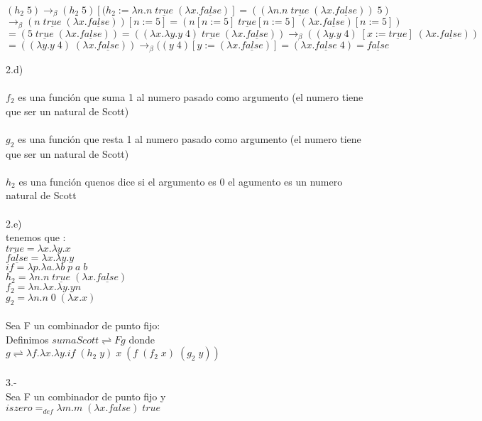 \documentclass{article}
\begin{document}
\begin{flushleft}
	\[(h_{2} \;5) \rightarrow_{\beta} (h_{2} \;5) [(h_{2} := \lambda n.n  \; \underline {true} \;(\lambda x.  \underline {false})]  =( ( \lambda n.n  \; \underline {true} \;(\lambda x.  \underline 		{false})) \;5 )\]
	\[ \rightarrow_{\beta}(n  \; \underline {true} \;(\lambda x.  \underline {false}))[n := 5] = (n[n := 5]   \; \underline {true}[n := 5]  \;(\lambda x.  \underline {false})[n := 5] )\]
	\[ = (5  \; \underline {true} \;(\lambda x.  \underline {false})) =( (\lambda x.\lambda y. y\; 4)\; \underline {true}  \;(\lambda x.  \underline {false}))  \rightarrow_{\beta} ( (\lambda y. y \; 4)\; 		[x:= \underline {true} ] \;(\lambda x.  \underline {false})) \]
	\[=((\lambda y. y \; 4)\; (\lambda x.  \underline {false})) \rightarrow_{\beta} ((y \; 4)[y :=   (\lambda x.  \underline {false})] = (\lambda x.  \underline {false} \; 4) = \underline {false}\]

	2.d) \\ \ \\
	$f_{2}$ es una función que suma 1 al numero pasado como argumento (el numero tiene que ser  un natural de Scott) \\ \ \\
	$g_{2}$ es una función que resta 1 al numero pasado como argumento (el numero tiene que ser  un natural de Scott) \\ \ \\
	$h_{2}$ es una función quenos dice si el argumento es 0 el agumento es un numero natural de Scott\\ \ \\

	2.e)\\ 
	tenemos que : \\
	$\underline {true} =  \lambda x. \lambda y . x$\\ 
	$\underline {false} =  \lambda x. \lambda y . y$\\ 
	$\underline {if} =  \lambda p . \lambda a. \lambda b \; p \; a \; b$ \\
	$h_{2}  = \lambda n.n  \; \underline {true} \;(\lambda x.  \underline {false})$\\
	$f_{2} = \lambda n.\lambda x.\lambda y. y n$\\
	$g_{2} = \lambda n.n \;0 \;(\lambda x.x)$\\ \ \\
	
	Sea F un combinador de punto fijo:\\
	Definimos $ sumaScott \rightleftharpoons Fg $ donde \\
	$ g \rightleftharpoons \lambda f . \lambda x . \lambda y. \underline {if} \; (h_{2}\; y )  \; x \; ( f \; ( f_{2} \; x ) \; (g_{2} \; y )) $
	\\ \ \\
	3.-\\
	Sea F un combinador de punto fijo y\\$iszero =_{def} \lambda m.m\;(\lambda x.false)\;true$\\ \ \\
	

\end{flushleft}
\end{document}
